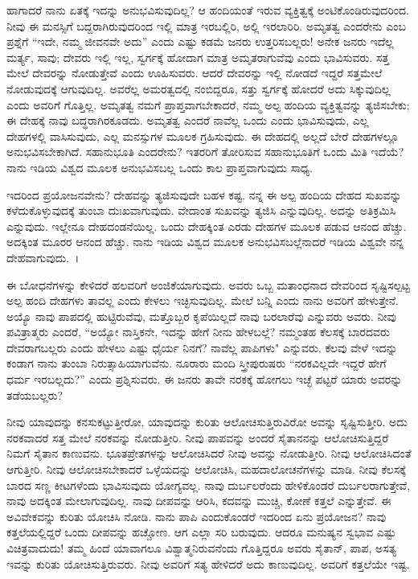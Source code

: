 ಹಾಗಾದರೆ ನಾನು ಏತಕ್ಕೆ ಇದನ್ನು ಅನುಭವಿಸುವುದಿಲ್ಲ? ಆ ಹಂದಿಯಂತೆ ಇರುವ ವ್ಯಕ್ತಿತ್ವಕ್ಕೆ ಅಂಟಿಕೊಂಡಿರುವುದರಿಂದ. ನೀವು ಈ ಮನಸ್ಸಿಗೆ ಬದ್ದರಾಗಿರುವುದರಿಂದ ಇಲ್ಲಿ ಮಾತ್ರ ಇರಬಲ್ಲಿರಿ, ಅಲ್ಲಿ ಇರಲಾರಿರಿ. ಅಮೃತತ್ವ ಎಂದರೇನು ಎಂಬ ಪ್ರಶ್ನೆಗೆ “ಇದೇ, ನಮ್ಮ ಜೀವನವೇ ಅದು'' ಎಂದು ಎಷ್ಟು ಕಡಮೆ ಜನರು ಉತ್ತರಿಸಬಲ್ಲರು! ಅನೇಕ ಜನರು ಇದೆಲ್ಲ ಮರ್ತ್ಯ, ಸಾವು; ದೇವರು ಇಲ್ಲಿ ಇಲ್ಲ, ಸ್ವರ್ಗಕ್ಕೆ ಹೋದಾಗ ಮಾತ್ರ ಅಮೃತರಾಗುವೆವು ಎಂದು ಭಾವಿಸುವರು. ಸತ್ತ ಮೇಲೆ ದೇವರನ್ನು ನೋಡುತ್ತೇವೆ ಎಂದು ಊಹಿಸುವರು. ಆದರೆ ದೇವರನ್ನು ಇಲ್ಲಿ ನೋಡದೆ ಇದ್ದರೆ ಸತ್ತಮೇಲೆ ನೋಡುವುದಕ್ಕೆ ಆಗುವುದಿಲ್ಲ. ಅವರೆಲ್ಲ ಅಮರತ್ವದಲ್ಲಿ ನಂಬಿದ್ದರೂ, ಸತ್ತು ಸ್ವರ್ಗಕ್ಕೆ ಹೋದರೆ ಅದು ಸಿಕ್ಕುವುದಿಲ್ಲ ಎಂದು ಅವರಿಗೆ ಗೊತ್ತಿಲ್ಲ. ಅಮೃತತ್ವ ನಮಗೆ ಪ್ರಾಪ್ತವಾಗಬೇಕಾದರೆ, ನಮ್ಮ ಅಲ್ಪ ಹಂದಿಯ ವ್ಯಕ್ತಿತ್ವವನ್ನು ತ್ಯಜಿಸಬೇಕು; ಈ ದೇಹಕ್ಕೆ ನಾವು ಬದ್ಧರಾಗಿರಕೂಡದು. ಅಮೃತತ್ವ ಎಂದರೆ ನಾವೆಲ್ಲ ಒಂದು ಎಂದು ಭಾವಿಸುವುದು, ಎಲ್ಲ ದೇಹಗಳಲ್ಲಿ ವಾಸಿಸುವುದು, ಎಲ್ಲ ಮನಸ್ಸುಗಳ ಮೂಲಕ ಗ್ರಹಿಸುವುದು. ಈ ದೇಹದಲ್ಲಿ ಅಲ್ಲದೆ ಬೇರೆ ದೇಹಗಳಲ್ಲೂ ಅನುಭವಿಸಬೇಕಾಗಿದೆ. ಸಹಾನುಭೂತಿ ಎಂದರೇನು? ಇತರರಿಗೆ ತೋರಿಸುವ ಸಹಾನುಭೂತಿಗೆ ಒಂದು ಮಿತಿ ಇದೆಯೆ? ನಾನು ಇಡಿಯ ವಿಶ್ವದ ಮೂಲಕ ಅನುಭವಿಸಬಲ್ಲ ಒಂದು ಕಾಲ ಪ್ರಾಪ್ತವಾಗುವುದು ಸಾಧ್ಯ.

ಇದರಿಂದ ಪ್ರಯೋಜನವೇನು? ದೇಹವನ್ನು ತ್ಯಜಿಸುವುದೇ ಬಹಳ ಕಷ್ಟ. ನನ್ನ ಈ ಅಲ್ಪ ಹಂದಿಯ ದೇಹದ ಸುಖವನ್ನು ಕಳೆದುಕೊಳ್ಳುವುದಕ್ಕೆ ತುಂಬಾ ದುಃಖವಾಗುವುದು. ವೇದಾಂತ ಸುಖವನ್ನು ತ್ಯಜಿಸಿ ಎನ್ನುವುದಿಲ್ಲ. ಅದನ್ನು ಅತಿಕ್ರಮಿಸಿ ಎನ್ನುವುದು. ಇಲ್ಲೇನೂ ದೇಹದಂಡನೆಯಿಲ್ಲ. ಒಂದು ದೇಹಕ್ಕಿಂತ ಎರಡು ದೇಹಗಳ ಮೂಲಕ ಪಡುವ ಆನಂದ ಹೆಚ್ಚು. ಅದಕ್ಕಿಂತ ಮೂರರ ಆನಂದ ಹೆಚ್ಚು. ನಾನು ಇಡಿಯ ವಿಶ್ವದ ಮೂಲಕ ಅನುಭವಿಸಬಲ್ಲೆನಾದರೆ ಇಡಿಯ ವಿಶ್ವವೇ ನನ್ನ ದೇಹವಾಗುವುದು.~।

ಈ ಬೋಧನೆಗಳನ್ನು ಕೇಳಿದರೆ ಹಲವರಿಗೆ ಅಂಜಿಕೆಯಾಗುವುದು. ಅವರು ಒಬ್ಬ ಮತಾಂಧನಾದ ದೇವರಿಂದ ಸೃಷ್ಟಿಸಲ್ಪಟ್ಟ ಅಲ್ಪ ಹಂದಿ ದೇಹಗಳು ತಾವಲ್ಲ ಎಂದು ಕೇಳಲು ಇಚ್ಛಿಸುವುದಿಲ್ಲ. ಮೇಲೆ ಬನ್ನಿ ಎಂದು ನಾನು ಅವರಿಗೆ ಹೇಳುತ್ತೇನೆ. ಅಯ್ಯೊ ನಾವು ಪಾಪದಲ್ಲಿ ಹುಟ್ಟಿರುವೆವು, ಮತ್ತೊಬ್ಬರ ಕೃಪೆಯಿಲ್ಲದೆ ನಾವು ಬರಲಾರೆವು ಎನ್ನುವರು ಅವರು. ನೀವು ಪವಿತ್ರಾತ್ಮರು ಎಂದರೆ, “ಅಯ್ಯೋ ನಾಸ್ತಿಕನೇ, ಇದನ್ನು ಹೇಗೆ ನೀನು ಹೇಳಬಲ್ಲೆ? ನಮ್ಮಂತಹ ಕೆಲಸಕ್ಕೆ ಬಾರದವರು ದೇವರಾಗಬಲ್ಲರು ಎಂದು ಹೇಳಲು ಎಷ್ಟು ಧೈರ್ಯ ನಿನಗೆ? ನಾವೆಲ್ಲ ಪಾಪಿಗಳು" ಎನ್ನುವರು. ಕೆಲವು ವೇಳೆ ಇದನ್ನು ಕಂಡಾಗ ನಾನು ತುಂಬಾ ನಿರುತ್ಸಾಹಿಯಾಗುವೆನು. ನೂರಾರು ಮಂದಿ ಸ್ತ್ರೀಪುರುಷರು “ನರಕವಿಲ್ಲದೇ ಇದ್ದರೆ ಹೇಗೆ ಧರ್ಮ ಇರಬಲ್ಲದು?'' ಎಂದು ಪ್ರಶ್ನಿಸುವರು. ಈ ಜನರು ತಾವೇ ನರಕಕ್ಕೆ ಹೋಗಲು ಇಚ್ಛೆ ಪಟ್ಟರೆ ಯಾರು ಅವರನ್ನು ತಡೆಯಬಲ್ಲರು?

ನೀವು ಯಾವುದನ್ನು ಕನಸುಕಟ್ಟುತ್ತೀರೋ, ಯಾವುದನ್ನು ಕುರಿತು ಆಲೋಚಿಸುತ್ತಿರುವಿರೋ ಅವನ್ನು ಸೃಷ್ಟಿಸುತ್ತೀರಿ. ಅದು ನರಕವಾದರೆ ಸತ್ತ ಮೇಲೆ ನರಕವನ್ನು ನೋಡುತ್ತೀರಿ. ನೀವು ಪಾಪವನ್ನು ಅಂದರೆ ಸೈತಾನನನ್ನು ಆಲೋಚಿಸುತ್ತಿದ್ದರೆ ನಿಮಗೆ ಸೈತಾನ ಕಾಣುವನು. ಭೂತಪ್ರೇತಗಳನ್ನು ಆಲೋಚಿಸಿದರೆ ನೀವು ಅವನ್ನು ನೋಡುತ್ತೀರಿ. ನೀವು ಆಲೋಚಿಸಿದಂತೆ ಆಗುತ್ತೀರಿ. ನೀವು ಆಲೋಚಿಸಬೇಕಾದರೆ ಒಳ್ಳೆಯದನ್ನು ಆಲೋಚಿಸಿ, ಮಹದಾಲೋಚನೆಗಳನ್ನು ಮಾಡಿ. ನೀವು ಕೆಲಸಕ್ಕೆ ಬಾರದ ಸಣ್ಣ ಕೀಟಗಳೆಂದು ಭಾವಿಸುವುದು ಯೋಗ್ಯವಲ್ಲ. ನಾವು ದುರ್ಬಲರೆಂದು ಹೇಳಿಕೊಂಡರೆ ದುರ್ಬಲರಾಗುತ್ತೇವೆ, ನಾವು ಅದಕ್ಕಿಂತ ಮೇಲಾಗುವುದಿಲ್ಲ. ನಾವು ದೀಪವನ್ನು ಆರಿಸಿ, ಕದವನ್ನು ಮುಚ್ಚಿ, ಕೋಣೆ ಕತ್ತಲೆ ಎನ್ನುತ್ತೇವೆ. ಈ ಅವಿವೇಕವನ್ನು ಕುರಿತು ಯೋಚಿಸಿ ನೋಡಿ. ನಾನು ಪಾಪಿ ಎಂದುಕೊಂಡರೆ ಇದರಿಂದ ಏನು ಪ್ರಯೋಜನ? ನಾವು ಕತ್ತಲೆಯಲ್ಲಿದ್ದರೆ ಒಂದು ದೀಪವನ್ನು ಹಚ್ಚೋಣ. ಆಗ ಎಲ್ಲಾ ಸರಿ ಬರುವುದು. ಆದರೂ ಮನುಷ್ಯನ ಸ್ವಭಾವ ಎಷ್ಟು ವಿಚಿತ್ರವಾದುದು! ತಮ್ಮ ಹಿಂದೆ ಯಾವಾಗಲೂ ವಿಶ್ವಾತ್ಮನಿರುವನೆಂದು ಗೊತ್ತಿದ್ದರೂ ಅವರು ಸೈತಾನ್, ಪಾಪ, ಅಸತ್ಯ ಇವನ್ನು ಕುರಿತು ಯೋಚಿಸುತ್ತಿರುವರು. ನೀವು ಅವರಿಗೆ ಸತ್ಯ ಹೇಳಿದರೆ ಅದು ಕಾಣುವುದಿಲ್ಲ. ಅವರಿಗೆ ಕತ್ತಲೆಯೇ ಇಷ್ಟ.

